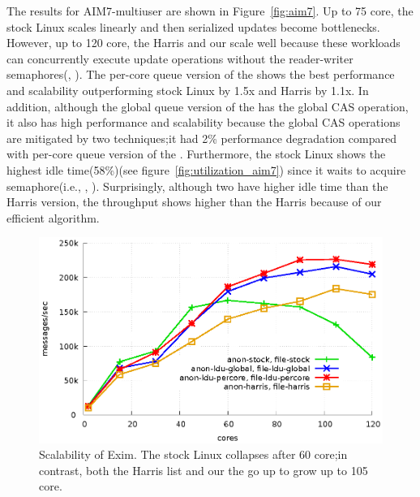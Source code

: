 The results for AIM7-multiuser are shown in Figure~\ref{fig:aim7}.
Up to 75 core, the stock Linux scales linearly and then serialized updates
become bottlenecks.
However, up to 120 core, the Harris and our \LDU scale well because
these workloads can concurrently execute update operations without the
reader-writer semaphores(, ).
The per-core queue version of the \LDU shows the best performance and
scalability outperforming stock Linux by 1.5x and Harris by
1.1x.
In addition, although the global queue version of the \LDU has the global CAS operation, it
also has high performance and scalability because the global CAS operations are
mitigated by two \LDU techniques;it had 2\% performance degradation compared with
per-core queue version of the \LDU.
Furthermore, the stock Linux shows the highest idle time(58\%)(see
figure~\ref{fig:utilization_aim7}) since it waits to acquire semaphore(i.e., , ).
Surprisingly, although two \LDU have higher idle time than the Harris version, the throughput shows higher than the Harris because of our efficient algorithm.
\begin{figure}[tb]
  \begin{center}
    \includegraphics[scale=0.8]{graph/exim.eps}
  \end{center}
  \caption{Scalability of Exim. The stock Linux collapses after 60 core;in
  contrast, both the Harris list and our the \LDU go up to grow up to 105 core.}
  \label{fig:exim}
\end{figure}

